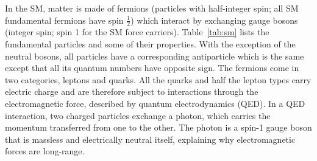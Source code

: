 In the SM, matter is made of fermions (particles with half-integer spin; all SM fundamental fermions have spin $\frac{1}{2}$) which interact by exchanging gauge bosons (integer spin; spin 1 for the SM force carriers).
Table~\ref{tab:sm} lists the fundamental particles and some of their properties.
With the exception of the neutral bosons, all particles have a corresponding antiparticle which is the same except that all its quantum numbers have opposite sign.
The fermions come in two categories, leptons and quarks.
All the quarks and half the lepton types carry electric charge and are therefore subject to interactions through the electromagnetic force, described by quantum electrodynamics (QED).
In a QED interaction, two charged particles exchange a photon, which carries the momentum transferred from one to the other.
The photon is a spin-1 gauge boson that is massless and electrically neutral itself, explaining why electromagnetic forces are long-range.
%

